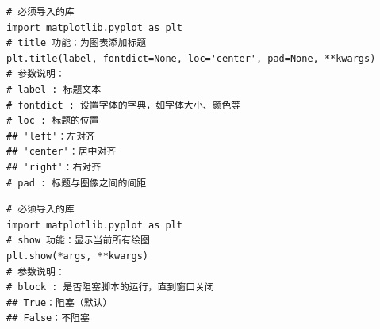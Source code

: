 \begin{lstlisting}[style=demostyle,numbers=none]
# 必须导入的库
import matplotlib.pyplot as plt
# title 功能：为图表添加标题
plt.title(label, fontdict=None, loc='center', pad=None, **kwargs)
# 参数说明：
# label : 标题文本
# fontdict : 设置字体的字典，如字体大小、颜色等
# loc : 标题的位置
## 'left'：左对齐
## 'center'：居中对齐
## 'right'：右对齐
# pad : 标题与图像之间的间距
\end{lstlisting}

\begin{lstlisting}[style=demostyle,numbers=none]
# 必须导入的库
import matplotlib.pyplot as plt
# show 功能：显示当前所有绘图
plt.show(*args, **kwargs)
# 参数说明：
# block : 是否阻塞脚本的运行，直到窗口关闭
## True：阻塞（默认）
## False：不阻塞
\end{lstlisting}